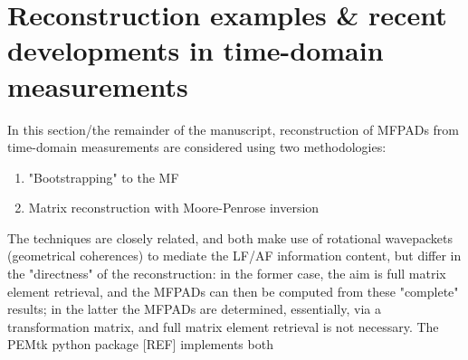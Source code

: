 \section{Reconstruction examples & recent developments in time-domain measurements}

In this section/the remainder of the manuscript, reconstruction of MFPADs from time-domain measurements are considered using two methodologies:

\begin{enumerate}
\item "Bootstrapping" to the MF \cite{hockett2018QMP1,hockett2018QMP2,marceau2017MolecularFrameReconstruction}
\item Matrix reconstruction with Moore-Penrose inversion \cite{gregory2021MolecularFramePhotoelectron}
\end{enumerate}

The techniques are closely related, and both make use of rotational wavepackets (geometrical coherences) to mediate the LF/AF information content, but differ in the "directness" of the reconstruction: in the former case, the aim is full matrix element retrieval, and the MFPADs can then be computed from these "complete" results; in the latter the MFPADs are determined, essentially, via a transformation matrix, and full matrix element retrieval is not necessary. The PEMtk python package [REF] implements  both
